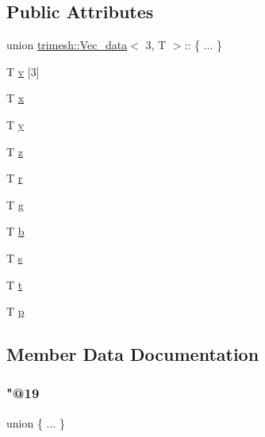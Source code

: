 \subsection*{Public Attributes}
\begin{DoxyCompactItemize}
\item 
union \hyperlink{structtrimesh_1_1Vec__data}{trimesh\+::\+Vec\+\_\+data}$<$ 3, T $>$\+:: \{ ... \}  
\item 
T \hyperlink{structtrimesh_1_1Vec__data_3_013_00_01T_01_4_a8ceda74f65ec97c6009d490d3d197d13}{v} \mbox{[}3\mbox{]}
\item 
T \hyperlink{structtrimesh_1_1Vec__data_3_013_00_01T_01_4_a690019913a5e76f38f3f52a9b1e664b0}{x}
\item 
T \hyperlink{structtrimesh_1_1Vec__data_3_013_00_01T_01_4_acdfbcb7be40b11f06c9d507ecfda381c}{y}
\item 
T \hyperlink{structtrimesh_1_1Vec__data_3_013_00_01T_01_4_a1ebe21e7854eb7118560b3558839c55b}{z}
\item 
T \hyperlink{structtrimesh_1_1Vec__data_3_013_00_01T_01_4_a97429562b0a34d60bbd766c354fc6df0}{r}
\item 
T \hyperlink{structtrimesh_1_1Vec__data_3_013_00_01T_01_4_a1808965983667caf789eb709af1079df}{g}
\item 
T \hyperlink{structtrimesh_1_1Vec__data_3_013_00_01T_01_4_a70035288638bc1d0a375c95839a7c38e}{b}
\item 
T \hyperlink{structtrimesh_1_1Vec__data_3_013_00_01T_01_4_ae827cf5eecc6f0895aa6134b7ec2cef5}{s}
\item 
T \hyperlink{structtrimesh_1_1Vec__data_3_013_00_01T_01_4_a2e1f5ea7b4d79518ef5a064ce75f3c69}{t}
\item 
T \hyperlink{structtrimesh_1_1Vec__data_3_013_00_01T_01_4_a1f03e4aaf11a43904a0fb11ca91f98ca}{p}
\end{DoxyCompactItemize}


\subsection{Member Data Documentation}
\mbox{\label{structtrimesh_1_1Vec__data_3_013_00_01T_01_4_a5735f18e153c50f469c2a649573e2352}} 
\subsubsection{\texorpdfstring{"@19}{@19}}
{\footnotesize\ttfamily union \{ ... \} }

